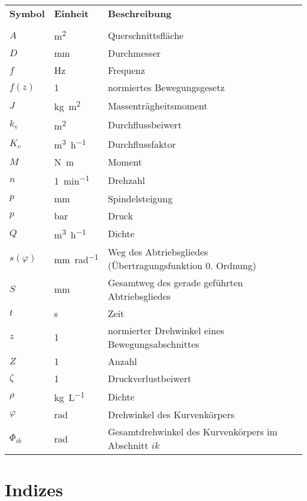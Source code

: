 \begin{tabularx}{\textwidth}{lll}
\textbf{Symbol} & \textbf{Einheit} & \textbf{Beschreibung}\\
& & \\
$A$ & \si{\meter\squared} & Querschnittsfläche \\
$D$ & \si{\milli\meter} & Durchmesser \\
$f$ & \si{\hertz} & Frequenz \\
$f(z)$ & 1 & normiertes Bewegungsgesetz \\
$J$ & \si{\kilogram\meter\squared} & Massenträgheitsmoment \\
$k_\mathrm{v}$ & \si{\meter\squared} & Durchflussbeiwert  \\
$K_v$ & \si{\cubic\meter\per\hour} & Durchflussfaktor \\
$M$ & \si{\newton\meter} & Moment \\
$n$ & \si{1\per\minute} & Drehzahl \\
$p$ & \si{\milli\meter} & Spindelsteigung \\
$p$ & \si{\bar} & Druck \\
$Q$ & \si{\cubic\meter\per\hour} & Dichte \\
$s(\varphi)$ & \si{\milli\meter\per\radian} & Weg des Abtriebsgliedes (Übertragungsfunktion 0. Ordnung) \\
$S$ & \si{\milli\meter} & Gesamtweg des gerade geführten Abtriebsgliedes \\
$t$ & \si{\second} & Zeit \\
$z$ & 1 & normierter Drehwinkel eines Bewegungsabschnittes \\
$Z$ & 1 & Anzahl \\
$\zeta$ & 1 & Druckverlustbeiwert \\
$\rho$ & \si{\kilogram\per\liter} & Dichte \\
$\varphi$ & \si{\radian} & Drehwinkel des Kurvenkörpers \\
$\Phi_{ik}$ & \si{\radian} & Gesamtdrehwinkel des Kurvenkörpers im Abschnitt $ik$  \\
\end{tabularx}

\clearpage

\section*{Indizes}

